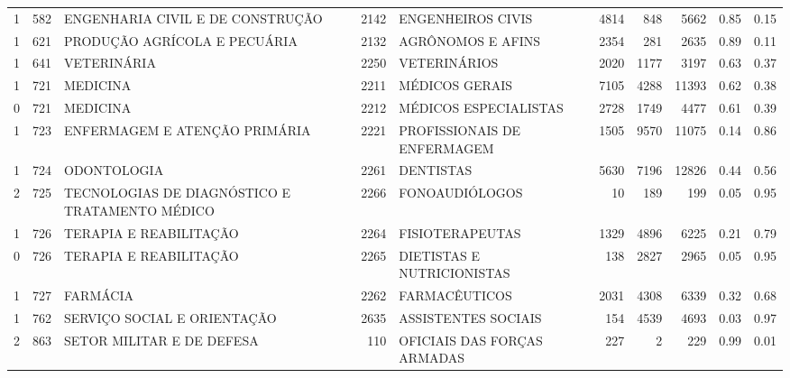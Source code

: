 \begin{table}
\begin{tabular}{rrlrlrrrrr}
       1 &    582 &                   ENGENHARIA CIVIL E DE CONSTRUÇÃO & 2142 &                                 ENGENHEIROS CIVIS  &  4814 &   848 &   5662 & 0.85 & 0.15 \\
       1 &    621 &                       PRODUÇÃO AGRÍCOLA E PECUÁRIA & 2132 &                                  AGRÔNOMOS E AFINS &  2354 &   281 &   2635 & 0.89 & 0.11 \\
       1 &    641 &                                        VETERINÁRIA & 2250 &                                       VETERINÁRIOS &  2020 &  1177 &   3197 & 0.63 & 0.37 \\
       1 &    721 &                                           MEDICINA & 2211 &                                     MÉDICOS GERAIS &  7105 &  4288 &  11393 & 0.62 & 0.38 \\
       0 &    721 &                                           MEDICINA & 2212 &                              MÉDICOS ESPECIALISTAS &  2728 &  1749 &   4477 & 0.61 & 0.39 \\
       1 &    723 &                      ENFERMAGEM E ATENÇÃO PRIMÁRIA & 2221 &                       PROFISSIONAIS DE ENFERMAGEM  &  1505 &  9570 &  11075 & 0.14 & 0.86 \\
       1 &    724 &                                        ODONTOLOGIA & 2261 &                                          DENTISTAS &  5630 &  7196 &  12826 & 0.44 & 0.56 \\
       2 &    725 &     TECNOLOGIAS DE DIAGNÓSTICO E TRATAMENTO MÉDICO & 2266 &                                     FONOAUDIÓLOGOS &    10 &   189 &    199 & 0.05 & 0.95 \\
       1 &    726 &                             TERAPIA E REABILITAÇÃO & 2264 &                                    FISIOTERAPEUTAS &  1329 &  4896 &   6225 & 0.21 & 0.79 \\
       0 &    726 &                             TERAPIA E REABILITAÇÃO & 2265 &                         DIETISTAS E NUTRICIONISTAS &   138 &  2827 &   2965 & 0.05 & 0.95 \\
       1 &    727 &                                           FARMÁCIA & 2262 &                                      FARMACÊUTICOS &  2031 &  4308 &   6339 & 0.32 & 0.68 \\
       1 &    762 &                        SERVIÇO SOCIAL E ORIENTAÇÃO & 2635 &                                ASSISTENTES SOCIAIS &   154 &  4539 &   4693 & 0.03 & 0.97 \\
       2 &    863 &                          SETOR MILITAR E DE DEFESA &  110 &                        OFICIAIS DAS FORÇAS ARMADAS &   227 &     2 &    229 & 0.99 & 0.01 \\
\bottomrule
\end{tabular}
\end{table}
